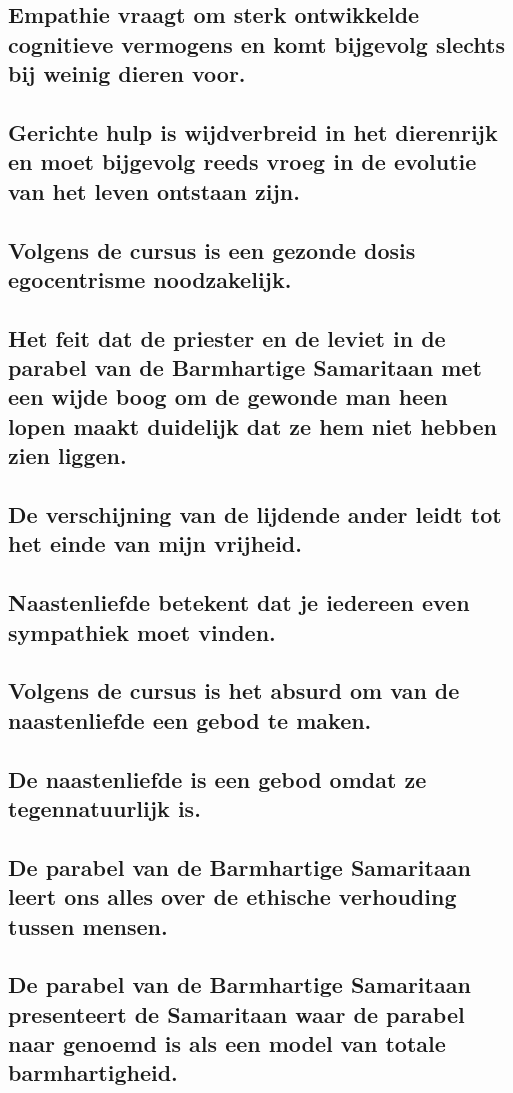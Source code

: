 \documentclass[main.tex]{subfiles}
\begin{document}
\subsection{Empathie vraagt om sterk ontwikkelde cognitieve vermogens en komt bijgevolg slechts bij weinig dieren voor.}
\subsection{Gerichte hulp is wijdverbreid in het dierenrijk en moet bijgevolg reeds vroeg in de evolutie van het leven ontstaan zijn.}
\subsection{Volgens de cursus is een gezonde dosis egocentrisme noodzakelijk.}
\subsection{Het feit dat de priester en de leviet in de parabel van de Barmhartige Samaritaan met een wijde boog om de gewonde man heen lopen maakt duidelijk dat ze hem niet hebben zien liggen.}
\subsection{De verschijning van de lijdende ander leidt tot het einde van mijn vrijheid.}
\subsection{Naastenliefde betekent dat je iedereen even sympathiek moet vinden.}
\subsection{Volgens de cursus is het absurd om van de naastenliefde een gebod te maken.}
\subsection{De naastenliefde is een gebod omdat ze tegennatuurlijk is.}
\subsection{De parabel van de Barmhartige Samaritaan leert ons alles over de ethische verhouding tussen mensen.}
\subsection{De parabel van de Barmhartige Samaritaan presenteert de Samaritaan waar de parabel naar genoemd is als een model van totale barmhartigheid.}
\end{document}
